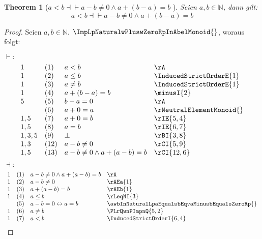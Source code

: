 \documentclass{book}
\theoremstyle{plain}
\newtheorem{theorem}{Theorem}
\theoremstyle{remark}
\theoremstyle{definition}
\begin{document}
\label{aLneqbEqvExnInNaturalLpnNotEqualsZeroAndaPlusnEqualsbRp}
\begin{theorem}[\(a<b\dashv\vdash a-b\neq 0\land a+(b-a)=b \) ] Seien \(a,b\in\mathbb{N}\), dann gilt:
\[a<b\dashv\vdash a-b\neq 0\land a+(b-a)=b\]
\end{theorem}
\begin{proof}
Seien \(a,b\in\mathbb{N}\). \(\ImpLpNaturalwPluswZeroRpInAbelMonoid{}\), woraus folgt:

\(\vdash:\)
	\[
	\begin{array}{llll}
		1 & (1) & a<b & \rA \\
		1 & (2) & a\leq b & \InducedStrictOrderE{1} \\
		1 & (3) & a\neq b & \InducedStrictOrderE{1} \\
            1 & (4) & a+(b-a)=b & \minusI{2} \\
            5 & (5) & b-a = 0 & \rA \\
              & (6) & a + 0 = a & \rNeutralElementMonoid{} \\
          1,5 & (7) & a + 0 = b& \rIE{5,4} \\
          1,5 & (8) & a = b& \rIE{6,7} \\
        1,3,5 & (9) & \bot & \rBI{3,8} \\
        1,3 & (12) & a-b\neq 0 & \rCI{5,9} \\
        1,5 & (13) & a-b\neq 0\land a + (a-b) = b & \rCI{12,6} \\
	\end{array}
	\]
	\(\dashv:\)
	\[
	\begin{array}{llll}
		1 & (1) & a-b\neq 0\land a + (a-b) = b & \rA \\
            1 & (2) & a-b\neq 0 & \rAEa{1} \\
            1 & (3) & a + (a-b) = b & \rAEb{1} \\
            1 & (4) & a\leq b & \rLeqNI{3} \\
              & (5) & a-b=0\leftrightarrow a=b & \awbInNaturalLpaEqualsbEqvaMinusbEqualsZeroRp{} \\
            1 & (6) & a\neq b & \PLrQwnPImpnQ{5,2} \\
            1 & (7) & a<b & \InducedStrictOrderI{6,4} \\
	\end{array}
	\]
\end{proof}
\end{document}

